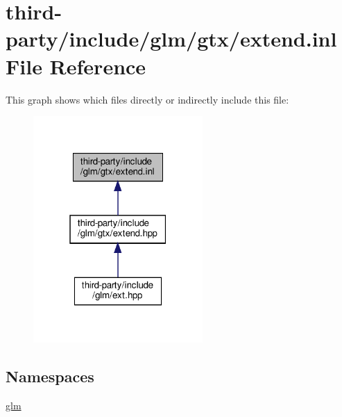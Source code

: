\hypertarget{extend_8inl}{}\section{third-\/party/include/glm/gtx/extend.inl File Reference}
\label{extend_8inl}
This graph shows which files directly or indirectly include this file\+:
\nopagebreak
\begin{figure}[H]
\begin{center}
\leavevmode
\includegraphics[width=183pt]{extend_8inl__dep__incl}
\end{center}
\end{figure}
\subsection*{Namespaces}
\begin{DoxyCompactItemize}
\item 
 \hyperlink{namespaceglm}{glm}
\end{DoxyCompactItemize}
